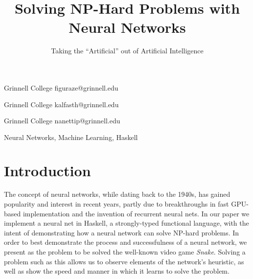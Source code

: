 \documentclass{sigplanconf}
\begin{document}
\setlength{\pdfpageheight}{\paperheight}
\setlength{\pdfpagewidth}{\paperwidth}




\title{Solving NP-Hard Problems with Neural Networks}
\subtitle{Taking the ``Artificial'' out of Artificial Intelligence}

           {Grinnell College}
           {figuraze@grinnell.edu}
           
           {Grinnell College}
           {kalfasth@grinnell.edu}
           
           {Grinnell College}
           {nanettip@grinnell.edu}


\maketitle

\begin{abstract}


\end{abstract}


\keywords
Neural Networks, Machine Learning, Haskell

\section{Introduction}

The concept of neural networks, while dating back to the 1940s, has gained popularity and interest in recent years, partly due to breakthroughs in fast GPU-based implementation and the invention of recurrent neural nets. In our paper we implement a neural net in Haskell, a strongly-typed functional language, with the intent of demonstrating how a neural network can solve NP-hard problems. In order to best demonstrate the process and successfulness of a neural network, we present as the problem to be solved the well-known video game \textit{Snake}. Solving a problem such as this allows us to observe elements of the network's heuristic, as well as show the speed and manner in which it learns to solve the problem.
\end{document}

